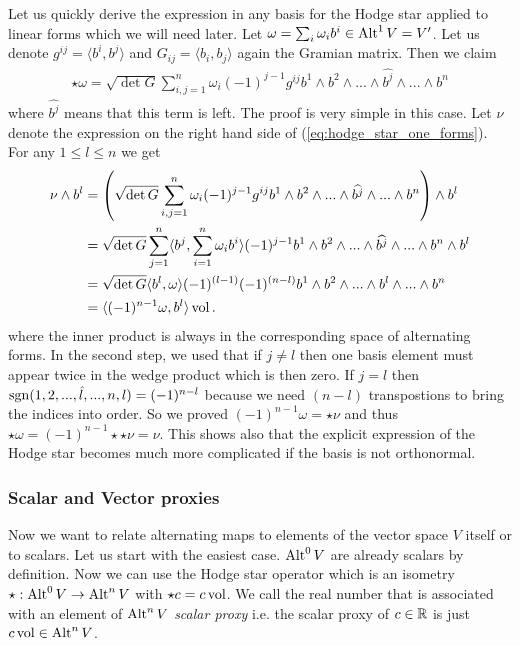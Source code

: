 \documentclass[../main.tex]{subfiles}
\begin{document}
Let us quickly derive the expression in any basis 
for the Hodge star applied to linear 
forms which we will need later. Let $\omega = \sum_i \omega_i b^i \in 
{\text{Alt}^{1}\,V} = V'$. Let us denote $g^{ij} = \langle b^i, b^j \rangle$ 
and $G_{ij} = \langle b_i, b_j \rangle$ again the Gramian matrix.
Then we claim
\begin{align}
    \star \omega = \sqrt{\det G} \sum_{i,j=1}^n \omega_i (-1)^{j-1} 
        g^{ij} b^1 \wedge
        b^2 \wedge ... \wedge \widehat{b^j}\wedge ... \wedge b^n 
        \label{eq:hodge_star_one_forms}
\end{align}
where $\widehat{b^j}$ means that this term is left. The proof is very 
simple in this case. Let $\nu$ denote the expression on the right hand side 
of (\ref{eq:hodge_star_one_forms}).
For any $1 \leq l \leq n$ we get
\begin{align*}
    \nu \wedge b^l &= \left( \sqrt{\det G} \sum_{i,j=1}^n \omega_i (-1)^{j-1} g^{ij} b^1 \wedge
        b^2 \wedge ... \wedge \widehat{b^j} \wedge ... \wedge b^n\right) \wedge b^l 
    \\ &= \sqrt{\det G} \sum_{j=1}^n \langle b^j,\sum_{i=1}^n \omega_i  b^i\rangle
        (-1)^{j-1}  b^1 \wedge
        b^2 \wedge ... \wedge \widehat{b^j} \wedge ... \wedge b^n \wedge b^l
    \\ &= \sqrt{\det G} \langle b^l,\omega \rangle
        (-1)^{(l-1)}(-1)^{(n-l)}  b^1 \wedge
        b^2 \wedge ... \wedge b^l  \wedge ... \wedge b^n 
    \\ &= \langle (-1)^{n-1}\omega, b^l \rangle \operatorname{vol}.
\end{align*}
where the inner product is always in the corresponding space of alternating forms.
In the second step, we used that if $j\neq l$ then one basis element must 
appear twice in the wedge product which is then zero. If $j=l$ then 
$\operatorname{sgn} (1,2, ..., \hat{l},...,n,l) = (-1)^{n-l}$ because we need $(n-l)$
transpostions to bring the indices into order. So we proved 
$(-1)^{n-1}\omega = \star \nu$ and thus $\star \omega = (-1)^{n-1} \star\star\nu = \nu$.
This shows also that the explicit expression of the Hodge star becomes much more 
complicated if the basis is not orthonormal.


\subsubsection{Scalar and Vector proxies} \label{sec:scalar_and_vector_proxies}
Now we want to relate alternating maps to elements of the 
vector space $V$ itself or to scalars. Let us start with the easiest 
case. ${\text{Alt}^{0}\,V}$ are already scalars by definition. Now we can use 
the Hodge star operator which is an isometry 
$\star: {\text{Alt}^{0}\,V} \rightarrow {\text{Alt}^{n}\,V}$ with
$\star c = c \operatorname{vol}$. 
We call the real number that is associated with an element of 
${\text{Alt}^{n}\,V}$ \textit{scalar proxy} i.e. the scalar proxy of 
$c \in \mathbb{R}$ is just $c \operatorname{vol} \in {\text{Alt}^{n}\,V}$.
\end{document}
